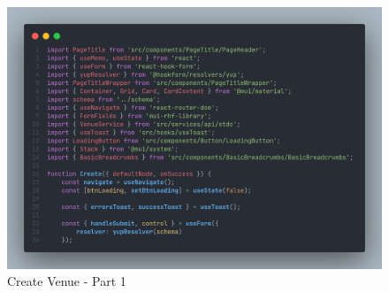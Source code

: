 \begin{justify}
\begin{itemize}
                \begin{figure}[H]
                    \centerline{\includegraphics[width=150mm,scale=1]{figures/implementation_and_testing/implementation/frontend/create_venue-1.png}}
                    \caption{Create Venue - Part 1}
                \end{figure}
    

\end{itemize}
\end{justify}

